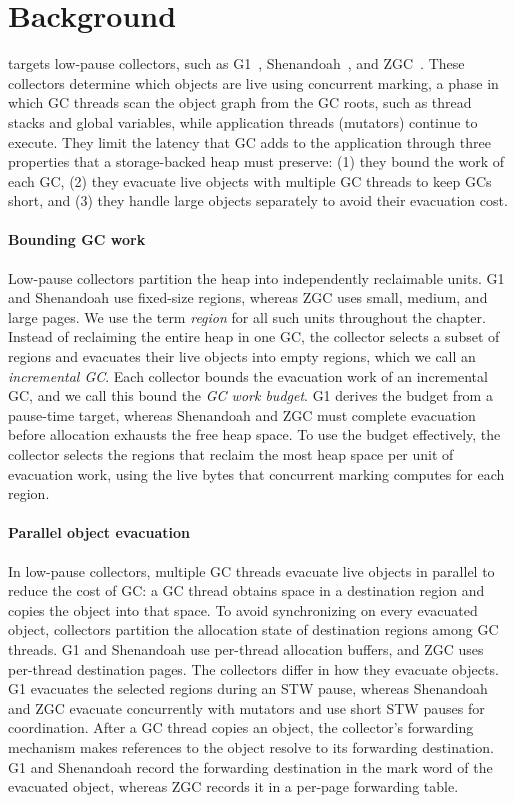\section{Background}
\label{sec:background}

\chipperName{} targets low-pause collectors, such as G1~\cite{detlefs:g1}, Shenandoah~\cite{flood:shenandoah}, and ZGC~\cite{yang:zgc}.
These collectors determine which objects are live using concurrent marking, a phase in which GC threads scan the object graph from the GC roots, such as thread stacks and global variables, while application threads (mutators) continue to execute.
They limit the latency that GC adds to the application through three properties that a storage-backed heap must preserve: (1) they bound the work of each GC, (2) they evacuate live objects with multiple GC threads to keep GCs short, and (3) they handle large objects separately to avoid their evacuation cost.

\paragraph{\textbf{Bounding GC work}}
Low-pause collectors partition the heap into independently reclaimable units.
G1 and Shenandoah use fixed-size regions, whereas ZGC uses small, medium, and large pages.
We use the term \emph{region} for all such units throughout the chapter.
Instead of reclaiming the entire heap in one GC, the collector selects a subset of regions and evacuates their live objects into empty regions, which we call an \emph{incremental GC}.
Each collector bounds the evacuation work of an incremental GC, and we call this bound the \emph{GC work budget}.
G1 derives the budget from a pause-time target, whereas Shenandoah and ZGC must complete evacuation before allocation exhausts the free heap space.
To use the budget effectively, the collector selects the regions that reclaim the most heap space per unit of evacuation work, using the live bytes that concurrent marking computes for each region.

\paragraph{\textbf{Parallel object evacuation}}
In low-pause collectors, multiple GC threads evacuate live objects in parallel to reduce the cost of GC: a GC thread obtains space in a destination region and copies the object into that space.
To avoid synchronizing on every evacuated object, collectors partition the allocation state of destination regions among GC threads.
G1 and Shenandoah use per-thread allocation buffers, and ZGC uses per-thread destination pages.
The collectors differ in how they evacuate objects.
G1 evacuates the selected regions during an STW pause, whereas Shenandoah and ZGC evacuate concurrently with mutators and use short STW pauses for coordination.
After a GC thread copies an object, the collector's forwarding mechanism makes references to the object resolve to its forwarding destination.
G1 and Shenandoah record the forwarding destination in the mark word of the evacuated object, whereas ZGC records it in a per-page forwarding table.

